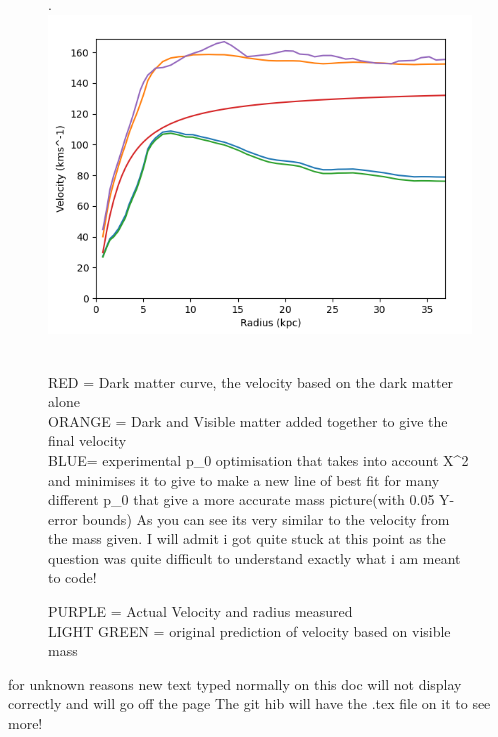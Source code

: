 \documentclass[10pt, twocolumn, twoside]{article}
\begin{document}
\begin{figure}[ht] .
\includegraphics[width=\columnwidth]{captureQ16.png}
\caption[width=\columnwidth]{PURPLE = Actual Velocity and radius measured \\
LIGHT GREEN = original prediction of velocity based on visible mass} \\
RED = Dark matter curve, the velocity based on the dark matter alone \\
ORANGE = Dark and Visible matter added together to give the final velocity \\
BLUE= experimental p_0 optimisation that takes into account X^2 and minimises it to give to make a new line of best fit for many different p_0 that give a more accurate mass picture(with 0.05 Y-error bounds)
As you can see its very similar to the velocity from the mass given. I will admit i got quite stuck at this point as the question was quite difficult to understand exactly what i am meant to code!
\end{figure}
\begin{thebibliography}{1}



\end{thebibliography}
for unknown reasons new text typed normally on this doc will not display correctly and will go off the page The git hib will have the .tex file on it to see more!
\end{document}
